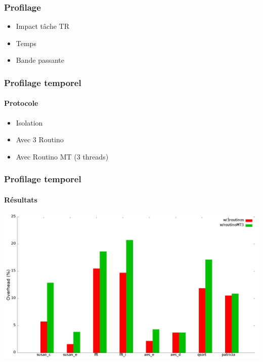 
\begin{frame}
\frametitle{Profilage}
\begin{itemize}
  \item Impact tâche TR
    \vspace{1em}
  \item Temps
    \vspace{1em}
  \item Bande passante
\end{itemize}
\end{frame}


\begin{frame}
\frametitle{Profilage temporel}
\framesubtitle{Protocole}
\begin{itemize}
  \item Isolation
    \vspace{1em}
  \item Avec 3 Routino
    \vspace{1em}
  \item Avec Routino MT (3 threads)
\end{itemize}
\end{frame}


\begin{frame}
\frametitle{Profilage temporel}
\framesubtitle{Résultats}
\begin{center}
\includegraphics[scale=0.2]{include/overhead.png}
\end{center}
\end{frame}


